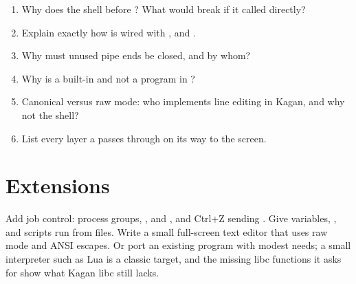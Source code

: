 \documentclass[11pt,a4paper]{article}
\begin{document}
\begin{questionbox}
\begin{enumerate}
  \item Why does the shell  before ? What would break if it called  directly?
  \item Explain exactly how  is wired with ,  and .
  \item Why must unused pipe ends be closed, and by whom?
  \item Why is  a built-in and not a program in ?
  \item Canonical versus raw mode: who implements line editing in Kagan, and why not the shell?
  \item List every layer a  passes through on its way to the screen.
\end{enumerate}
\end{questionbox}

\section{Extensions}

Add job control: process groups, ,  and , and Ctrl+Z sending . Give
 variables, ,  and scripts run from files. Write a small full-screen text editor that uses
raw mode and ANSI escapes. Or port an existing program with modest needs; a small interpreter such as Lua is a
classic target, and the missing libc functions it asks for show what Kagan libc still lacks.

\booklegend
\end{document}
